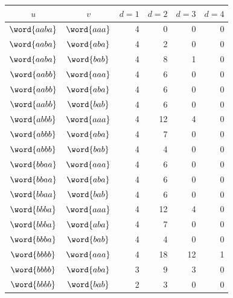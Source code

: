 \begin{center}
\begin{tabular}{ccrrrr}
\toprule
$u$&$v$&$d=1$&$d=2$&$d=3$&$d=4$\\
\midrule
$\word{aaba}$ & $\word{aaa}$ & 4 & 0 & 0 & 0\\
$\word{aaba}$ & $\word{aba}$ & 4 & 2 & 0 & 0\\
$\word{aaba}$ & $\word{bab}$ & 4 & 8 & 1 & 0\\
$\word{aabb}$ & $\word{aaa}$ & 4 & 6 & 0 & 0\\
$\word{aabb}$ & $\word{aba}$ & 4 & 6 & 0 & 0\\
$\word{aabb}$ & $\word{bab}$ & 4 & 6 & 0 & 0\\
$\word{abbb}$ & $\word{aaa}$ & 4 & 12 & 4 & 0\\
$\word{abbb}$ & $\word{aba}$ & 4 & 7 & 0 & 0\\
$\word{abbb}$ & $\word{bab}$ & 4 & 4 & 0 & 0\\
$\word{bbaa}$ & $\word{aaa}$ & 4 & 6 & 0 & 0\\
$\word{bbaa}$ & $\word{aba}$ & 4 & 6 & 0 & 0\\
$\word{bbaa}$ & $\word{bab}$ & 4 & 6 & 0 & 0\\
$\word{bbba}$ & $\word{aaa}$ & 4 & 12 & 4 & 0\\
$\word{bbba}$ & $\word{aba}$ & 4 & 7 & 0 & 0\\
$\word{bbba}$ & $\word{bab}$ & 4 & 4 & 0 & 0\\
$\word{bbbb}$ & $\word{aaa}$ & 4 & 18 & 12 & 1\\
$\word{bbbb}$ & $\word{aba}$ & 3 & 9 & 3 & 0\\
$\word{bbbb}$ & $\word{bab}$ & 2 & 3 & 0 & 0\\
\bottomrule
\end{tabular}
\end{center}
